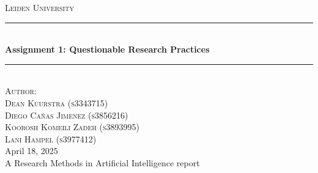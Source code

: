 \documentclass[12pt]{article}
\begin{document}

\begin{titlepage}

\newcommand{\HRule}{\rule{\linewidth}{0.5mm}}

\center
\begin{figure}[H]  \end{figure}
\textsc{\LARGE Leiden University}\\[1.5cm]


\HRule \\[0.9cm]
{ \huge \bfseries Assignment 1: Questionable Research Practices}\\[0.1cm] %
\HRule \\[1.5cm]

\textsc{Author:}\\[0.3cm]
\textsc{\Large Dean Kuurstra (s3343715)}\\[0.5cm]
\textsc{\Large Diego Cañas Jimenez (s3856216)}\\[0.5cm]
\textsc{\Large Koorosh Komeili Zadeh (s3893995)}\\[0.5cm]
\textsc{\Large Lani Hampel (s3977412)}\\[0.5cm]

\large April 18, 2025\\
A Research Methods in Artificial Intelligence report\\

\vfill %

\end{titlepage}

\newpage
\end{document}
